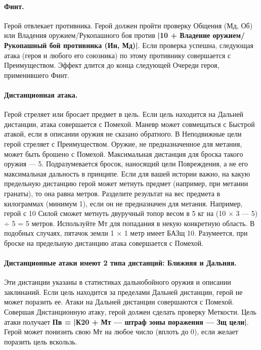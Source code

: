 \paragraph{Финт.} Герой отвлекает противника. Герой должен пройти проверку Общения (Мд, Об) или Владения оружием/Рукопашного боя против \textbf{|10 + Владение оружием/Рукопашный бой противника (Ин, Мд)|}. Если проверка успешна, следующая атака (героя и любого его союзника) по этому противнику совершается с Преимуществом. Эффект длится до конца следующей Очереди героя, применившего Финт.
\paragraph{Дистанционная атака.} Герой стреляет или бросает предмет в цель. Если цель находится на Дальней дистанции, атака совершается с Помехой. Маневр может совмещаться с Быстрой атакой, если в описании оружия не сказано обратного. В Неподвижные цели герой стреляет с Преимуществом.
\newline
Оружие, не предназначенное для метания, может быть брошено с Помехой. Максимальная дистанция для броска такого оружия — 5. Подразумевается бросок, наносящий цели Повреждения, а не его максимальная дальность в принципе.
\newline
Если для вашей истории важно, на какую предельную дистанцию герой может метнуть предмет (например, при метании гранаты), то она равна  метров. Разделите результат на вес предмета в килограммах (минимум 1), если он не предназначен для метания. Например, герой с 10 Силой сможет метнуть двуручный топор весом в 5 кг на (10 × 3 — 5) ÷ 5 = 5 метров. Используйте Мт для попадания в некую конкретную область. В подобных случаях, пятачок земли 1 × 1 метр имеет БАЗщ 10. Разумеется, при броске на предельную дистанцию атака совершается с Помехой.
\paragraph{Дистанционные атаки имеют 2 типа дистанций: Ближняя и Дальняя.} Эти дистанции указаны в статистиках дальнобойного оружия и описании заклинаний. Если цель находится за пределами Дальней дистанции, герой не может поразить ее. Атаки на Дальней дистанции совершаются с Помехой. Совершая Дистанционную атаку, герой должен сделать проверку Меткости. Цель атаки получает \textbf{Пв = |К20 + Мт — штраф зоны поражения — Зщ цели|}. Герой может понизить свою Мт на любое число (вплоть до 0), если желает поразить цель вскользь.
